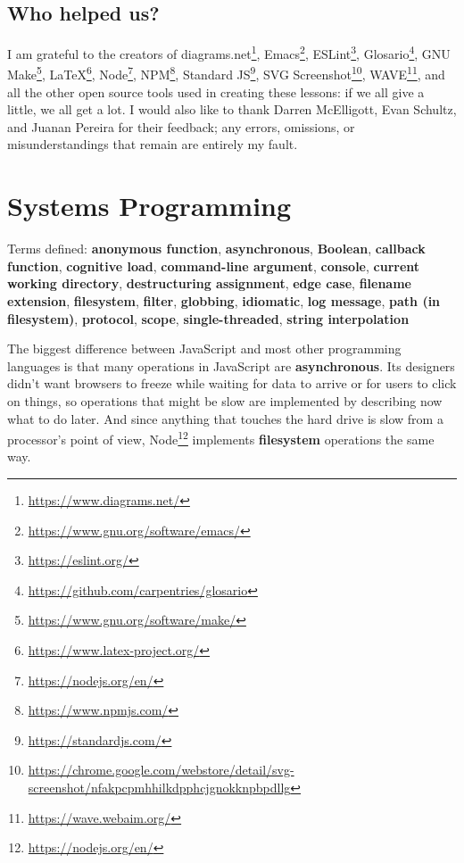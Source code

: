 \documentclass[krantzl]{krantz}
\newcommand{\glossref}[1]{\textbf{#1}}
\newcommand{\hreffoot}[2]{{#1}\footnote{\href{#2}{#2}}}
\begin{document}
\section{Who helped us?}\label{introduction-help}


I am grateful to the creators of \hreffoot{diagrams.net}{https://www.diagrams.net/},
\hreffoot{Emacs}{https://www.gnu.org/software/emacs/},
\hreffoot{ESLint}{https://eslint.org/},
\hreffoot{Glosario}{https://github.com/carpentries/glosario},
\hreffoot{GNU Make}{https://www.gnu.org/software/make/},
\hreffoot{LaTeX}{https://www.latex-project.org/},
\hreffoot{Node}{https://nodejs.org/en/},
\hreffoot{NPM}{https://www.npmjs.com/},
\hreffoot{Standard JS}{https://standardjs.com/},
\hreffoot{SVG Screenshot}{https://chrome.google.com/webstore/detail/svg-screenshot/nfakpcpmhhilkdpphcjgnokknpbpdllg},
\hreffoot{WAVE}{https://wave.webaim.org/},
and all the other open source tools used in creating these lessons:
if we all give a little,
we all get a lot.
I would also like to thank Darren McElligott, Evan Schultz, and Juanan Pereira
for their feedback;
any errors, omissions, or misunderstandings that remain are entirely my fault.

\chapter{Systems Programming}\label{systems-programming}


\noindent 
  Terms defined: \glossref{anonymous function}, \glossref{asynchronous}, \glossref{Boolean}, \glossref{callback function}, \glossref{cognitive load}, \glossref{command-line argument}, \glossref{console}, \glossref{current working directory}, \glossref{destructuring assignment}, \glossref{edge case}, \glossref{filename extension}, \glossref{filesystem}, \glossref{filter}, \glossref{globbing}, \glossref{idiomatic}, \glossref{log message}, \glossref{path (in filesystem)}, \glossref{protocol}, \glossref{scope}, \glossref{single-threaded}, \glossref{string interpolation}



The biggest difference between JavaScript and most other programming languages
is that many operations in JavaScript are \glossref{asynchronous}.
Its designers didn’t want browsers to freeze while waiting for data to arrive or for users to click on things,
so operations that might be slow are implemented by describing now what to do later.
And since anything that touches the hard drive is slow from a processor’s point of view,
\hreffoot{Node}{https://nodejs.org/en/} implements \glossref{filesystem} operations the same way.
\end{document}
